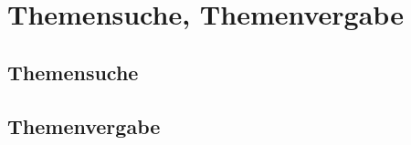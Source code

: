 \chapter{Themensuche, Themenvergabe}
\label{themensuche-vergabe}
\section{Themensuche}
\label{themensuche}

\section{Themenvergabe}
\label{themenvergabe}

